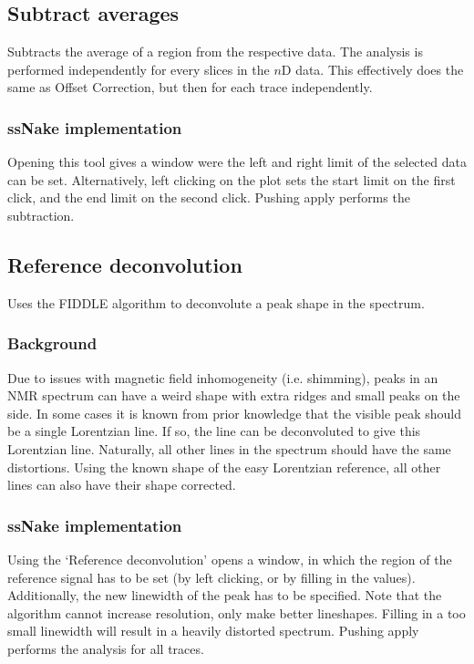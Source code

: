 \documentclass[11pt,a4paper]{article}
\begin{document}
\subsection{Subtract averages}
Subtracts the average of a region from the respective data. The analysis is performed independently for every slices in the $n$D data. This effectively does the same as Offset Correction, but then for each trace independently.

\subsubsection*{ssNake implementation}
Opening this tool gives a window were the left and right limit of the selected data can be set. Alternatively, left clicking on the plot sets the start limit on the first click, and the end limit on the second click. Pushing apply performs the subtraction.

\subsection{Reference deconvolution}
Uses the FIDDLE algorithm to deconvolute a peak shape in the spectrum.

\subsubsection*{Background}
Due to issues with magnetic field inhomogeneity (i.e. shimming), peaks in an NMR spectrum can have a weird shape with extra ridges and small peaks on the side. In some cases it is known from prior knowledge that the visible peak should be a single Lorentzian line. If so, the line can be deconvoluted to give this Lorentzian line. Naturally, all other lines in the spectrum should have the same distortions. Using the known shape of the easy Lorentzian reference, all other lines can also have their shape corrected.

\subsubsection*{ssNake implementation}
Using the `Reference deconvolution' opens a window, in which the region of the reference signal has to be set (by left clicking, or by filling in the values). Additionally, the new linewidth of the peak has to be specified. Note that the algorithm cannot increase resolution, only make better lineshapes. Filling in a too small linewidth will result in a heavily distorted spectrum. Pushing apply performs the analysis for all traces.
\end{document}

